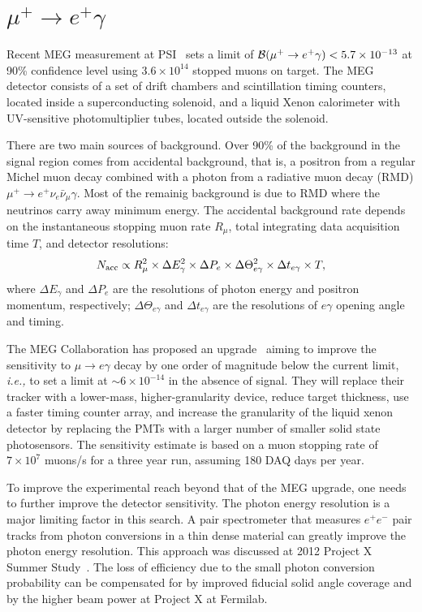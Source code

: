 \section{$\mu^+\to e^+\gamma$}

Recent MEG measurement at PSI~\cite{MEG2013} sets a limit of 
${\cal B}(\mu^+\to e^+\gamma)< 5.7\times 10^{-13}$ at 90\% confidence
level using $3.6\times 10^{14}$ stopped muons on target. The MEG detector
consists of a set of drift chambers and scintillation timing counters,
located inside a superconducting solenoid, and a liquid Xenon 
calorimeter with UV-sensitive photomultiplier tubes, located outside the
solenoid. 

There are two main sources of background. Over 90\% of the background in
the signal region comes from accidental background, that is, a positron
from a regular Michel muon decay combined with a photon from a radiative
muon decay  (RMD) $\mu^+\to e^+ \nu_e\bar\nu_\mu \gamma$.
Most of the remainig background is due to RMD where the neutrinos carry away minimum
energy. The accidental background rate depends on the instantaneous stopping
muon rate $R_\mu$, total integrating data acquisition time $T$, and 
detector resolutions:
\begin{equation}
N_{\rm acc} \propto R_\mu^2 \times \Delta E_\gamma^2 \times\Delta P_e \times
\Delta \Theta_{e\gamma}^2 \times \Delta t_{e \gamma} \times T, 
\end{equation}
where $\Delta E_\gamma$ and $\Delta P_e$ are the resolutions of photon energy
and positron momentum, respectively; $\Delta \Theta_{e\gamma}$ and
$\Delta t_{e \gamma}$ are the resolutions of $e\gamma$ opening angle and
timing.

The MEG Collaboration has proposed an upgrade~\cite{MEGupgrade} aiming to 
improve the sensitivity to $\mu\to e\gamma$ decay 
by one order of magnitude below the current limit, {\it i.e.,} to set a limit at
$\sim 6\times 10^{-14}$ in the absence of signal. They will replace 
their tracker with a lower-mass, higher-granularity device, reduce target
thickness, use a faster timing counter array, and increase the 
granularity of the liquid xenon detector by replacing the PMTs with 
a larger number of smaller solid state photosensors. The sensitivity
estimate is based on a muon stopping rate of $7\times 10^7$ muons/s for 
a three year run, assuming 180 DAQ days per year.

To improve the experimental reach beyond that of the MEG upgrade, one needs to further improve the detector 
sensitivity. 
The photon energy resolution is a major limiting factor in this search.
A pair spectrometer that measures $e^+e^-$ pair tracks from photon
conversions in a thin dense material can greatly improve the photon energy
resolution. This approach was discussed at  2012 Project X Summer Study~\cite{Fritz}. The loss of efficiency due to the small photon conversion 
probability can be compensated for by improved fiducial solid angle coverage and by the higher beam power at Project X at 
Fermilab. 

